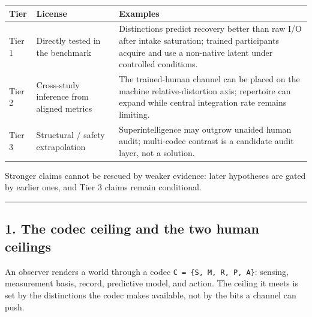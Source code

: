 \documentclass[
  11pt,
]{article}
\newcounter{none} %
\begin{document}
{\def\LTcaptype{none} %
\begin{longtable}[]{@{}
  >{\raggedright\arraybackslash}p{}
  >{\raggedright\arraybackslash}p{}
  >{\raggedright\arraybackslash}p{}@{}}
\toprule\noalign{}
\begin{minipage}[b]{\linewidth}\raggedright
Tier
\end{minipage} &
\begin{minipage}[b]{\linewidth}\raggedright
License
\end{minipage} &
\begin{minipage}[b]{\linewidth}\raggedright
Examples
\end{minipage} \\
\midrule\noalign{}
\endhead
\bottomrule\noalign{}
\endlastfoot
Tier 1 & Directly tested in the benchmark &
Distinctions predict recovery better than raw
I/O after intake saturation; trained
participants acquire and use a non-native latent
under controlled conditions. \\
Tier 2 & Cross-study inference from aligned
metrics & The trained-human channel can be
placed on the machine relative-distortion axis;
repertoire can expand while central integration
rate remains limiting. \\
Tier 3 & Structural / safety extrapolation &
Superintelligence may outgrow unaided human
audit; multi-codec contrast is a candidate audit
layer, not a solution. \\
\end{longtable}
}

Stronger claims cannot be rescued by weaker
evidence: later hypotheses are gated by earlier
ones, and Tier 3 claims remain conditional.

\begin{center}\rule{0.5\linewidth}{0.5pt}\end{center}

\subsection{1. The codec ceiling and the two
human
ceilings}\label{the-codec-ceiling-and-the-two-human-ceilings}

An observer renders a world through a codec
\texttt{C\ =\ \{S,\ M,\ R,\ P,\ A\}}: sensing,
measurement basis, record, predictive model, and
action. The ceiling it meets is set by the
distinctions the codec makes available, not by
the bits a channel can push.
\end{document}
